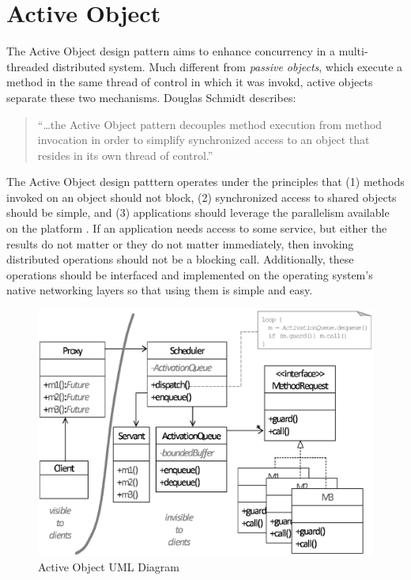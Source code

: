 \section{Active Object}

The Active Object design pattern aims to enhance concurrency in a multi-threaded
distributed system. Much different from \textit{passive objects}, which execute
a method in the same thread of control in which it was invokd, active objects
separate these two mechanisms. Douglas Schmidt describes:

\begin{quote}
``\ldots the Active Object pattern decouples method execution from method
invocation in order to simplify synchronized access to an object that resides in
its own thread of control.'' \cite{Schmidt96}
\end{quote}

The Active Object design patttern operates under the principles that (1) methods
invoked on an object should not block, (2) synchronized access to shared objects
should be simple, and (3) applications should leverage the parallelism available
on the platform \cite{Schmidt96}. If an application needs access to some
service, but either the results do not matter or they do not matter immediately,
then invoking distributed operations should not be a blocking call.
Additionally, these operations should be interfaced and implemented on the
operating system's native networking layers so that using them is simple and
easy.

\begin{figure}[t]
  \begin{center}
  \includegraphics[width=\textwidth]{images/activeObjectUML}
  \caption{Active Object UML Diagram}
  \label{fig:activeObjectUML}
  \end{center}
\end{figure}

